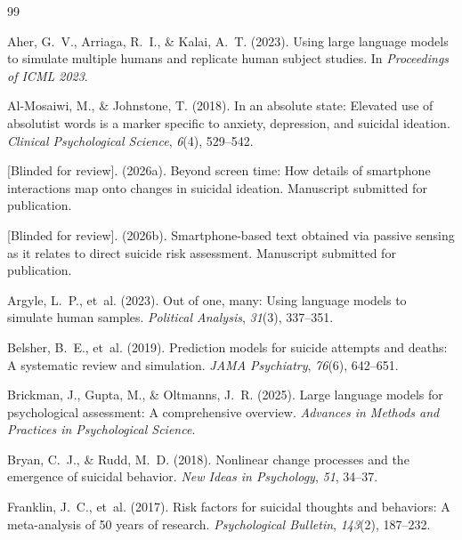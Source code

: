 \documentclass[review,12pt,authoryear]{elsarticle}
\begin{document}
\begin{thebibliography}{99}

Aher, G.~V., Arriaga, R.~I., \& Kalai, A.~T. (2023).
\newblock Using large language models to simulate multiple humans and replicate human subject studies.
\newblock In \textit{Proceedings of ICML 2023}.

Al-Mosaiwi, M., \& Johnstone, T. (2018).
\newblock In an absolute state: {E}levated use of absolutist words is a marker specific to anxiety, depression, and suicidal ideation.
\newblock \textit{Clinical Psychological Science}, \textit{6}(4), 529--542.

[Blinded for review]. (2026a).
\newblock Beyond screen time: {H}ow details of smartphone interactions map onto changes in suicidal ideation.
\newblock Manuscript submitted for publication.

[Blinded for review]. (2026b).
\newblock Smartphone-based text obtained via passive sensing as it relates to direct suicide risk assessment.
\newblock Manuscript submitted for publication.

Argyle, L.~P., et~al. (2023).
\newblock Out of one, many: {U}sing language models to simulate human samples.
\newblock \textit{Political Analysis}, \textit{31}(3), 337--351.

Belsher, B.~E., et~al. (2019).
\newblock Prediction models for suicide attempts and deaths: {A} systematic review and simulation.
\newblock \textit{JAMA Psychiatry}, \textit{76}(6), 642--651.

Brickman, J., Gupta, M., \& Oltmanns, J.~R. (2025).
\newblock Large language models for psychological assessment: {A} comprehensive overview.
\newblock \textit{Advances in Methods and Practices in Psychological Science}.

Bryan, C.~J., \& Rudd, M.~D. (2018).
\newblock Nonlinear change processes and the emergence of suicidal behavior.
\newblock \textit{New Ideas in Psychology}, \textit{51}, 34--37.

Franklin, J.~C., et~al. (2017).
\newblock Risk factors for suicidal thoughts and behaviors: {A} meta-analysis of 50 years of research.
\newblock \textit{Psychological Bulletin}, \textit{143}(2), 187--232.


\end{thebibliography}
\end{document}
